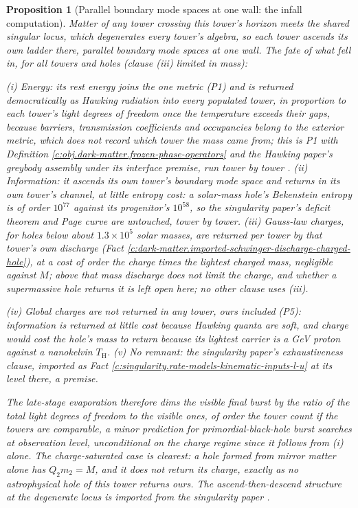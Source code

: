 \documentclass[11pt]{article}
\newtheorem{proposition}[theorem]{Proposition}
\theoremstyle{definition}
\theoremstyle{plain}
\begin{document}
\begin{proposition}[Parallel boundary mode spaces at one wall: the infall computation]\label{c:dark-matter.parallel-boundary-mode-spaces-one-wall}
Matter of any tower crossing this tower's horizon meets the shared singular locus, which degenerates every tower's algebra, so each tower ascends its own ladder there, parallel boundary mode spaces at one wall. The fate of what fell in, for all towers and holes (clause (iii) limited in mass):

(i) \emph{Energy:} its rest energy joins the one metric (P1) and is returned democratically as Hawking radiation into every populated tower, in proportion to each tower's light degrees of freedom once the temperature exceeds their gaps, because barriers, transmission coefficients and occupancies belong to the exterior metric, which does not record which tower the mass came from; this is P1 with Definition \ref{c:obj.dark-matter.frozen-phase-operators} and the Hawking paper's greybody assembly under its interface premise, run tower by tower \cite[Assembly~5.4]{ButlerT7}. (ii) \emph{Information:} it ascends its own tower's boundary mode space and returns in its own tower's channel, at little entropy cost: a solar-mass hole's Bekenstein entropy is of order $10^{77}$ against its progenitor's $10^{58}$, so the singularity paper's deficit theorem and Page curve are untouched, tower by tower. (iii) \emph{Gauss-law charges,} for holes below about $1.3 \times 10^{5}$ solar masses, are returned per tower by that tower's own discharge (Fact \ref{c:dark-matter.imported-schwinger-discharge-charged-hole}), at a cost of order the charge times the lightest charged mass, negligible against $M$; above that mass discharge does not limit the charge, and whether a supermassive hole returns it is left open here; no other clause uses (iii).

(iv) \emph{Global charges} are not returned in any tower, ours included (P5): information is returned at little cost because Hawking quanta are soft, and charge would cost the hole's mass to return because its lightest carrier is a GeV proton against a nanokelvin $T_{\mathrm{H}}$. (v) \emph{No remnant:} the singularity paper's exhaustiveness clause, imported as Fact \ref{c:singularity.rate-models-kinematic-inputs-l-u} at its level there, a premise.

The late-stage evaporation therefore dims the visible final burst by the ratio of the total light degrees of freedom to the visible ones, of order the tower count if the towers are comparable, a minor prediction for primordial-black-hole burst searches at observation level, unconditional on the charge regime since it follows from (i) alone. The charge-saturated case is clearest: a hole formed from mirror matter alone has $Q_{2}m_{2} = M$, and it does not return its charge, exactly as no astrophysical hole of this tower returns ours. The ascend-then-descend structure at the degenerate locus is imported from the singularity paper \cite{ButlerT5}.
\end{proposition}
\end{document}
